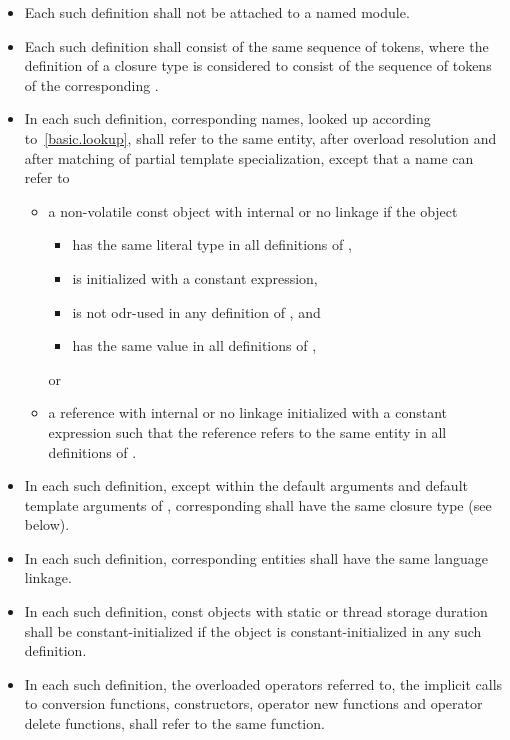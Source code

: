 \begin{itemize}
\item Each such definition
shall not be attached to a named module.
\item Each such definition shall consist of
the same sequence of tokens,
where the definition of a closure type
is considered to consist of the sequence of tokens of
the corresponding .
\item In each such definition, corresponding names, looked up
according to~\ref{basic.lookup}, shall refer to the same entity, after
overload resolution and after matching of partial
template specialization, except that a name can refer to
\begin{itemize}
\item
a non-volatile const object with internal or no linkage if the object
\begin{itemize}
\item has the same literal type in all definitions of ,
\item is initialized with a constant expression,
\item is not odr-used in any definition of , and
\item has the same value in all definitions of ,
\end{itemize}
or
\item
a reference with internal or no linkage
initialized with a constant expression such that
the reference refers to the same entity in all definitions of .
\end{itemize}

\item In each such definition, except within
the default arguments and default template arguments of ,
corresponding  shall have
the same closure type (see below).

\item In each such definition, corresponding entities shall have the
same language linkage.

\item In each such definition,
const objects with static or thread storage duration
shall be constant-initialized if
the object is constant-initialized in any such definition.

\item In each such definition, the overloaded operators referred
to, the implicit calls to conversion functions, constructors, operator
new functions and operator delete functions, shall refer to the same
function.


\end{itemize}
